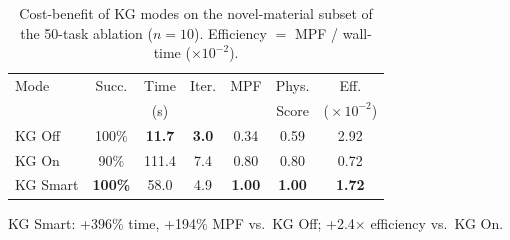 \begin{table}[t]
\centering
\caption{Cost-benefit of KG modes on the novel-material subset of the
50-task ablation ($n{=}10$).  
Efficiency $=$ MPF / wall-time ($\times10^{-2}$).}
\label{tab:cost-benefit}
\footnotesize
\setlength{\tabcolsep}{3.5pt}
\begin{tabular}{@{}lcccccc@{}}
\toprule
Mode & Succ. & Time & Iter. & MPF & Phys. & Eff. \\
     &       & (s)  &       &     & Score & ($\!\times\!10^{-2}$) \\
\midrule
KG Off   & 100\% & \textbf{11.7} & \textbf{3.0} & 0.34 & 0.59 & 2.92 \\
KG On    &  90\% & 111.4 & 7.4 & 0.80 & 0.80 & 0.72 \\
KG Smart & \textbf{100\%} & 58.0 & 4.9 & \textbf{1.00} & \textbf{1.00} & \textbf{1.72} \\
\bottomrule
\end{tabular}

\vspace{0.3em}
{\scriptsize KG Smart: +396\% time, +194\% MPF vs.\ KG Off; +2.4$\times$ efficiency vs.\ KG On.}
\end{table}
